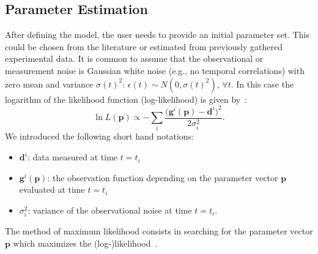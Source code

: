 \documentclass[graybox]{svmult}
\newcommand{\mbp}{\mathbf{p}}
\newcommand{\mbd}{\mathbf{d}}
\begin{document}
\subsection*{Parameter Estimation}
After defining the model, the user needs to provide an initial parameter set.
This could be chosen from the literature or estimated from previously gathered experimental data.
It is common to assume that the observational or measurement noise is Gaussian white noise (e.g., no temporal correlations) with zero mean and variance $\sigma(t)^2$: $\epsilon(t) \sim N(0, \sigma(t)^2)$, $\forall t$.
In this case the logarithm of the likelihood function (log-likelihood) is given by~\cite{kreutzProfileLikelihood2013}:
\begin{equation}
    \ln L(\mbp) \propto - \sum_{i}\frac{ \big(\mathbf{g}^{i}(\mbp) - \mbd^{i}\big)^2}{2 \sigma_{i}^2}.
    \label{eq:likelihood_Gaussian}
\end{equation}
We introduced the following short hand notations:
\begin{itemize}
\item $\mbd^{i}$: data measured at time $t=t_i$
\item $\mathbf{g}^{i}(\mbp)$: the observation function depending on the parameter vector $\mbp$ evaluated at time $t=t_i$
\item $\sigma_{i}^2$: variance of the observational noise at time $t=t_i$.
\end{itemize}
The method of maximum likelihood consists in searching for the parameter vector $\mbp$ which maximizes the (log-)likelihood~\cite{gaborRobustEfficient2015}.
%
%
\end{document}
